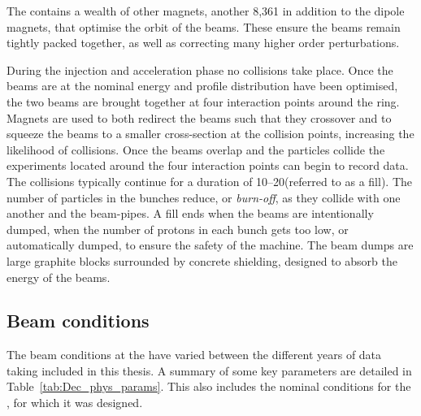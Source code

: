 The \lhc contains a wealth of other magnets, another 8,361 in addition to the dipole magnets, that optimise the orbit of the beams. These ensure the beams remain tightly packed together, as well as correcting many higher order perturbations.   

During the injection and acceleration phase no collisions take place. Once the beams are at the nominal energy and profile distribution have been optimised, the two beams are brought together at four interaction points around the ring. Magnets are used to both redirect the beams such that they crossover and to squeeze the beams to a smaller cross-section at the collision points, increasing the likelihood of collisions. Once the beams overlap and the particles collide the experiments located around the four interaction points can begin to record data. The collisions typically continue for a duration of 10--20\hr (referred to as a fill). The number of particles in the bunches reduce, or \emph{burn-off}, as they collide with one another and the beam-pipes. A fill ends when the beams are intentionally dumped, when the number of protons in each bunch gets too low, or automatically dumped, to ensure the safety of the machine. The beam dumps are large graphite blocks surrounded by concrete shielding, designed to absorb the energy of the beams.  






\subsection{Beam conditions}
\label{sec:Dec_beam_conds}
The beam conditions at the \lhc have varied between the different years of data taking included in this thesis. A summary of some key parameters are detailed in Table~\ref{tab:Dec_phys_params}. This also includes the nominal conditions for the \lhc, for which it was designed. 


